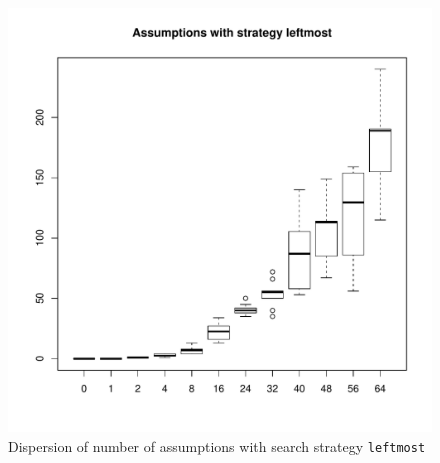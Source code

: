 \documentclass{article}
\newcommand{\code}[1]{\texttt{#1}}
\begin{document}
\begin{figure}
\centering
\includegraphics[width=\linewidth]{leftmost_assumptions}
\caption{Dispersion of number of assumptions with search strategy \code{leftmost}}
\label{fig:leftmost-assumptions}
\end{figure}


\printglossaries{}
\end{document}
